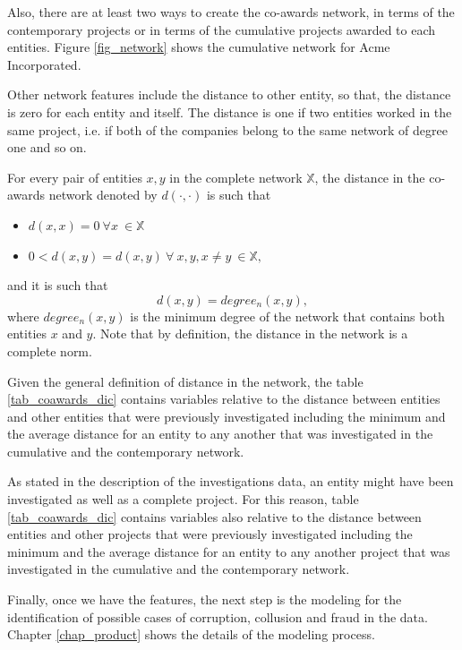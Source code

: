 Also, there are at least two ways to create the  co-awards network, in terms of the contemporary projects or in terms of the cumulative projects awarded to each entities. Figure \ref{fig_network} shows the cumulative network for Acme Incorporated.

Other network features include the distance to other entity, so that, the distance is zero for each entity and itself. The distance is one if two entities worked in the same project, i.e. if both of the companies belong to the same network of degree one and so on.

\begin{definition}
For every pair of  entities $x, y$ in the complete network $\mathbb{X}$, the distance in the co-awards network denoted by $d(\cdot,	\cdot)$ is such that
\begin{itemize}
\item $d(x,x)=0 \ \forall x \ \in  \mathbb{X} $
\item $0<d(x,y)=d(x,y) \ \forall \ x, y , x\neq y \ \in  \mathbb{X},$
\end{itemize}
and it is such that 
$$ d(x,y) = degree_{n}(x,y), $$
where $degree_{n}(x,y) $ is the minimum degree of the network that contains both entities $x$ and $y$.
Note that by definition, the distance in the network is a complete norm. 
\end{definition} 

Given the general definition of distance in the network, the table  \ref{tab_coawards_dic} contains variables relative to the distance between entities and  other entities that were previously investigated including the minimum and the  average distance for an entity to  any another that was investigated in the cumulative and the contemporary network.

As stated in the description of the investigations data, an entity might have been investigated as well as a complete project. For this reason, table \ref{tab_coawards_dic} contains variables also relative to the distance between entities and  other projects that were previously investigated including the minimum and the  average distance for an entity to any another project that was investigated in the cumulative and the contemporary network.

 
Finally, once we have the features, the next step is the modeling for the identification of possible cases of corruption, collusion and fraud in the data. Chapter \ref{chap_product} shows the details of the modeling process.
